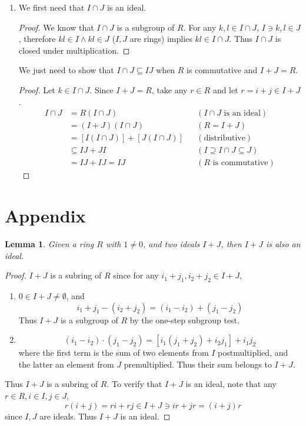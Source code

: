 \documentclass{article}
\theoremstyle{plain}
\newtheorem*{lemma*}{Lemma}
\begin{document}
\begin{enumerate}
	\item We first need that $I\cap J$ is an ideal.
	      \begin{proof}
		      We know that $I\cap J$ is a subgroup of $R$. For any $k,l\in I\cap J$, $I\ni{k,l}\in J$,
		      therefore $kl\in I \wedge kl\in J$ ($I,J$ are rings) implies $kl\in I\cap J$. Thus $I\cap J$ is
		      closed under multiplication.
	      \end{proof}
	      We just need to show that $I\cap J\subseteq IJ$ when $R$ is commutative and $I+J=R$.
	      \begin{proof}
		      Let $k\in I\cap J$. Since $I+J=R$, take any $r\in R$ and let $r=i+j\in I+J$.
		      \begin{align*}
			      I\cap J & = R(I\cap J)                  &  & (I\cap J \text{ is an ideal})   \\
			              & = (I+J)(I\cap J)              &  & (R=I+J)                         \\
			              & = [I(I\cap J)] + [J(I\cap J)] &  & (\text{distributive})           \\
			              & \subseteq IJ + JI             &  & (I\supseteq I\cap J\subseteq J) \\
			              & = IJ + IJ = IJ                &  & (R\text{ is commutative})
		      \end{align*}
	      \end{proof}
\end{enumerate}
\section*{Appendix}
\begin{lemma*}
	Given a ring $R$ with $1\neq0$, and two ideals $I+J$, then $I+J$ is also an ideal.
\end{lemma*}
\begin{proof}
	$I+J$ is a subring of $R$ since for any $i_{1}+j_{1},i_{2}+j_{2}\in I+J$,
	\begin{enumerate}
		\item $0\in I+J\neq\emptyset$, and
		      \[i_{1}+j_{1}-(i_{2}+j_{2})=(i_{1}-i_{2})+(j_{1}-j_{2})\]
		      Thus $I+J$ is a subgroup of $R$ by the one-step subgroup test.
		\item
		      \[ (i_{1}-i_{2})\cdot(j_{1}-j_{2})=[i_{1}(j_{1} + j_{2})+i_{2}j_{1}] + i_{1}j_{2}\]
		      where the first term is the sum of two elements from $I$ postmultiplied, and the
		      latter an element from $J$ premultiplied. Thus their sum belongs to $I+J$.
	\end{enumerate}
	Thus $I+J$ is a subring of $R$. To verify that $I+J$ is an ideal, note that
	any $r\in R, i\in I, j\in J$, \[r(i+j)=ri+rj\in I + J\ni ir+jr=(i+j)r\] since $I,J$
	are ideals. Thus $I+J$ is an ideal.
\end{proof}
\end{document}
